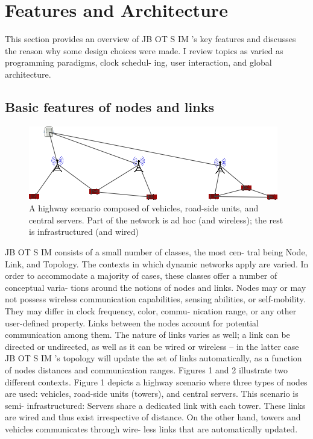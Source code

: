 \section{Features and Architecture}
This section provides an overview of JB OT S IM ’s key features
and discusses the reason why some design choices were made. I
review topics as varied as programming paradigms, clock schedul-
ing, user interaction, and global architecture.
\subsection{Basic features of nodes and links}

\begin{figure}[hbtp]
\centering
\includegraphics[scale=1]{screenshot_4.png}
\caption{A highway scenario composed of vehicles, road-side
units, and central servers. Part of the network is ad hoc (and
wireless); the rest is infrastructured (and wired)}
\end{figure}

JB OT S IM consists of a small number of classes, the most cen-
tral being Node, Link, and Topology. The contexts in which
dynamic networks apply are varied. In order to accommodate a
majority of cases, these classes offer a number of conceptual varia-
tions around the notions of nodes and links. Nodes may or may not
possess wireless communication capabilities, sensing abilities, or
self-mobility. They may differ in clock frequency, color, commu-
nication range, or any other user-defined property. Links between
the nodes account for potential communication among them. The
nature of links varies as well; a link can be directed or undirected,
as well as it can be wired or wireless – in the latter case JB OT S IM ’s
topology will update the set of links automatically, as a function of
nodes distances and communication ranges.
Figures 1 and 2 illustrate two different contexts. Figure 1 depicts
a highway scenario where three types of nodes are used: vehicles,
road-side units (towers), and central servers. This scenario is semi-
infrastructured: Servers share a dedicated link with each tower.
These links are wired and thus exist irrespective of distance. On
the other hand, towers and vehicles communicates through wire-
less links that are automatically updated.

